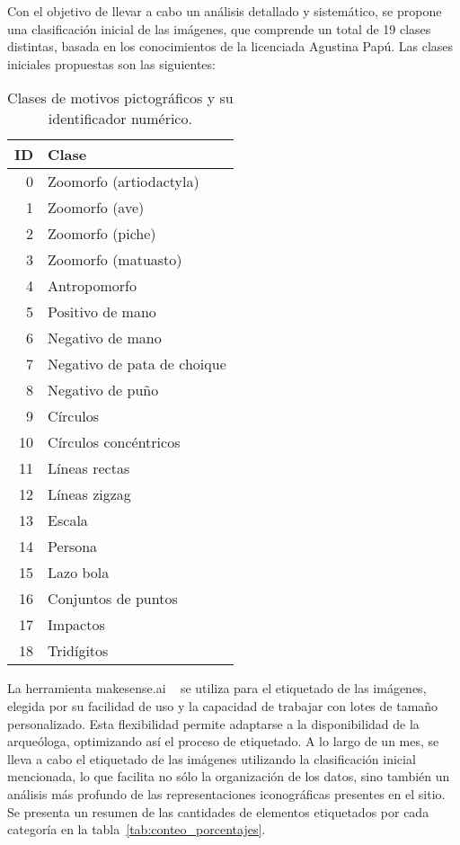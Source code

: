 Con el objetivo de llevar a cabo un análisis detallado y sistemático, se propone una clasificación inicial de las imágenes, que comprende un total de 19 clases distintas, basada en los conocimientos de la licenciada Agustina Papú.
Las clases iniciales propuestas son las siguientes:

\begin{table}[!h]
    \centering
    \begin{tabular}{r l}
        \hline
        \textbf{ID} & \textbf{Clase} \\
        \hline
        0  & Zoomorfo (artiodactyla) \\
        1  & Zoomorfo (ave) \\
        2  & Zoomorfo (piche) \\
        3  & Zoomorfo (matuasto) \\
        4  & Antropomorfo \\
        5  & Positivo de mano \\
        6  & Negativo de mano \\
        7  & Negativo de pata de choique \\
        8  & Negativo de puño \\
        9  & Círculos \\
        10 & Círculos concéntricos \\
        11 & Líneas rectas \\
        12 & Líneas zigzag \\
        13 & Escala \\
        14 & Persona \\
        15 & Lazo bola \\
        16 & Conjuntos de puntos \\
        17 & Impactos \\
        18 & Tridígitos \\
    \end{tabular}
    \caption{Clases de motivos pictográficos y su identificador numérico.}
    \label{tab:clases-motivos}
\end{table}

La herramienta makesense.ai ~\cite{makesense} se utiliza para el etiquetado de las imágenes, elegida por su facilidad de uso y la capacidad de trabajar con lotes de tamaño personalizado.
Esta flexibilidad permite adaptarse a la disponibilidad de la arqueóloga, optimizando así el proceso de etiquetado.
A lo largo de un mes, se lleva a cabo el etiquetado de las imágenes utilizando la clasificación inicial mencionada, lo que facilita no sólo la organización de los datos, sino también un análisis más profundo de las representaciones iconográficas presentes en el sitio.
Se presenta un resumen de las cantidades de elementos etiquetados por cada categoría en la tabla~\ref{tab:conteo_porcentajes}.

